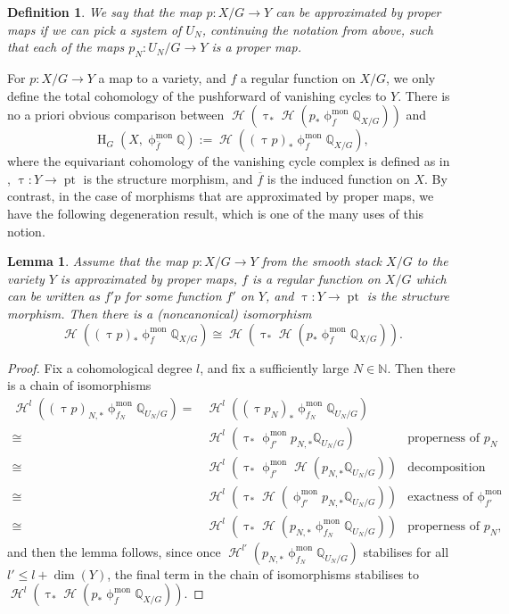 \documentclass[a4paper,10pt]{amsart}
\newtheorem{definition}[theorem]{Definition}
\newtheorem{lemma}[theorem]{Lemma}
\newcommand{\phim}[1]{\phi^{\mon}_{#1}}
\renewcommand{\phi}{\upphi}
\renewcommand{\tau}{\uptau}
\DeclareMathOperator{\mon}{mon}
\DeclareMathOperator{\pt}{pt}
\DeclareMathOperator{\Ho}{\mathcal{H}}
\DeclareMathOperator{\HO}{H}
\begin{document}
\begin{definition}\label{properMapsDef}
We say that the map $p\colon X/G\rightarrow Y$ can be \textit{approximated by proper maps} if we can pick a system of $U_N$, continuing the notation from above, such that each of the maps $p_N\colon U_N/G\rightarrow Y$ is a  proper map.
\end{definition}
For $p\colon X/G\rightarrow Y$ a map to a variety, and $f$ a regular function on $X/G$, we only define the total cohomology of the pushforward of vanishing cycles to $Y$.  There is no a priori obvious comparison between $\Ho\left(\tau_*\Ho(p_*\phim{f}\mathbb{Q}_{X/G})\right)$ and 
\[
\HO_G(X,\phim{\overline{f}}\mathbb{Q}):=\Ho((\tau p)_*\phim{f}\mathbb{Q}_{X/G}), 
\]
where the equivariant cohomology of the vanishing cycle complex is defined as in \cite{COHA}, $\tau\colon Y\rightarrow\pt$ is the structure morphism, and $\overline{f}$ is the induced function on $X$.  By contrast, in the case of morphisms that are approximated by proper maps, we have the following degeneration result, which is one of the many uses of this notion.
\begin{lemma}
Assume that the map $p\colon X/G\rightarrow Y$ from the smooth stack $X/G$ to the variety $Y$ is approximated by proper maps, $f$ is a regular function on $X/G$ which can be written as $f'p$ for some function $f'$ on $Y$, and $\tau\colon Y\rightarrow \pt$ is the structure morphism.  Then there is a (noncanonical) isomorphism
\[
\Ho((\tau p)_*\phim{f}\mathbb{Q}_{X/G})\cong\Ho\left(\tau_*\Ho(p_*\phim{f}\mathbb{Q}_{X/G})\right).
\]
\end{lemma}
\begin{proof}
Fix a cohomological degree $l$, and fix a sufficiently large $N\in\mathbb{N}$.  Then there is a chain of isomorphisms
\begin{align*}
\Ho^l((\tau p)_{N,*}\phim{f_N}\mathbb{Q}_{U_N/G})= &\Ho^l((\tau p_N)_*\phim{f_N}\mathbb{Q}_{U_N/G})
\\ \cong&\Ho^l(\tau_* \phim{f'} p_{N,*}\mathbb{Q}_{U_N/G})&\textrm{properness of }p_N
\\ \cong&\Ho^l(\tau_* \phim{f'} \Ho(p_{N,*}\mathbb{Q}_{U_N/G}))&\textrm{decomposition theorem}
\\ \cong&\Ho^l(\tau_* \Ho(\phim{f'} p_{N,*}\mathbb{Q}_{U_N/G})) &\textrm{exactness of }\phim{f'}
\\\cong&\Ho^l(\tau_* \Ho( p_{N,*}\phim{f_N}\mathbb{Q}_{U_N/G})) &\textrm{properness of }p_{N},
\end{align*}
and then the lemma follows, since once $\Ho^{l'}( p_{N,*}\phim{f_N}\mathbb{Q}_{U_N/G})$ stabilises for all $l'\leq l+\dim(Y)$, the final term in the chain of isomorphisms stabilises to $\Ho^l(\tau_* \Ho( p_{*}\phim{f}\mathbb{Q}_{X/G}))$.
\end{proof}
\end{document}
